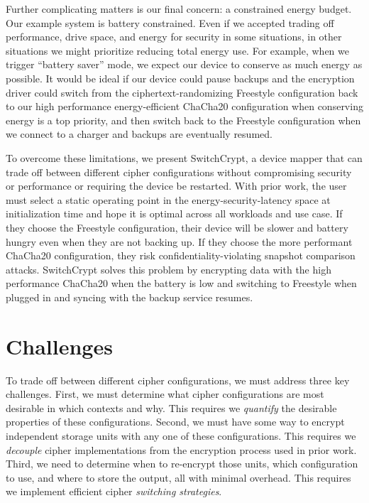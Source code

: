 Further complicating matters is our final concern: a constrained energy budget.
Our example system is battery constrained. Even if we accepted trading off
performance, drive space, and energy for security in some situations, in other
situations we might prioritize reducing total energy use. For example, when we
trigger ``battery saver'' mode, we expect our device to conserve as much energy
as possible. It would be ideal if our device could pause backups and the
encryption driver could switch from the ciphertext-randomizing Freestyle
configuration back to our high performance energy-efficient ChaCha20
configuration when conserving energy is a top priority, and then switch back to
the Freestyle configuration when we connect to a charger and backups are
eventually resumed.

To overcome these limitations, we present SwitchCrypt, a device mapper
that can trade off between different cipher configurations without
compromising security or performance or requiring the device be
restarted. With prior work, the user must select a static operating
point in the energy-security-latency space at initialization time and
hope it is optimal across all workloads and use case. If they choose
the Freestyle configuration, their device will be slower and battery
hungry even when they are not backing up. If they choose the more
performant ChaCha20 configuration, they risk confidentiality-violating
snapshot comparison attacks.  SwitchCrypt solves this problem by
encrypting data with the high performance ChaCha20 when the battery is
low and switching to Freestyle when plugged in and syncing with the
backup service resumes.

\section{Challenges}
\label{sec:key-challenges}

To trade off between different cipher configurations, we must address three key
challenges. First, we must determine what cipher configurations are most
desirable in which contexts and why. This requires we \emph{quantify} the
desirable properties of these configurations. Second, we must have some way to
encrypt independent storage units with any one of these configurations. This
requires we \emph{decouple} cipher implementations from the encryption process
used in prior work. Third, we need to determine when to re-encrypt those units,
which configuration to use, and where to store the output, all with minimal
overhead. This requires we implement efficient cipher \emph{switching
strategies}.

